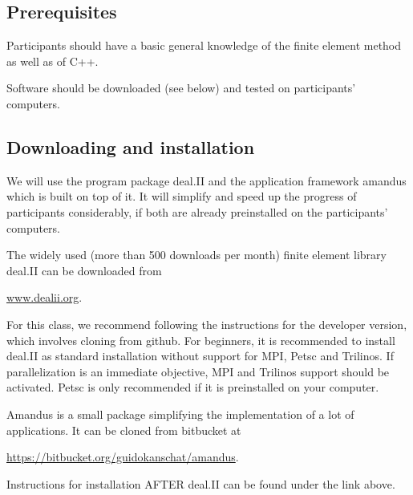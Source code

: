 \documentclass{article}
\begin{document}
\subsection*{Prerequisites}
Participants should have a basic general knowledge of the finite
element method as well as of C++.

Software should be downloaded (see below) and tested on participants'
computers.


\subsection*{Downloading and installation}

We will use the program package deal.II and the application framework
amandus which is built on top of it. It will simplify and speed up the
progress of participants considerably, if both are already
preinstalled on the participants' computers.

The widely used (more than 500 downloads per month) finite element
library deal.II can be downloaded from
\begin{center}
 \url{www.dealii.org}. 
\end{center}
For this class, we recommend following the instructions for the
developer version, which involves cloning from github. For beginners,
it is recommended to install deal.II as standard installation without
support for MPI, Petsc and Trilinos. If parallelization is an
immediate objective, MPI and Trilinos support should be
activated. Petsc is only recommended if it is preinstalled on your
computer.

Amandus is a small package simplifying the implementation of a lot of
applications. It can be cloned from bitbucket at
\begin{center}
  \url{https://bitbucket.org/guidokanschat/amandus}.
\end{center}
Instructions for installation AFTER deal.II can be found under the
link above.
\end{document}
